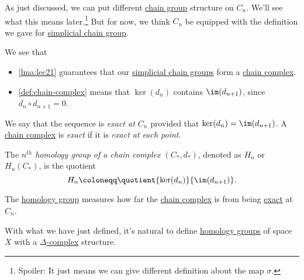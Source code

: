 \begin{note}
	As just discussed, we can put different \hyperref[def:chain-group]{chain group} structure on \(C_{n} \). We'll see what this means later.\footnote{Spoiler: It just means we can give different definition about the map \(\sigma\).} But for now, we think \(C_{n} \) be equipped with the definition we gave for \hyperref[def:simplicial-chain-group]{simplicial chain group}.
\end{note}

\begin{remark}
	We see that
	\begin{itemize}
		\item \autoref{lma:lec21} guarantees that our \hyperref[def:simplicial-chain-group]{simplicial chain groups} form a \hyperref[def:chain-complex]{chain complex}.
		\item \autoref{def:chain-complex} means that \(\ker (d_{n} ) \) contains \(\im  (d_{n+1})\), since \(d_{n} \circ d_{n+1} = 0\).
	\end{itemize}
\end{remark}

\begin{definition}[Exact]\label{def:exact}
	We say that the sequence is \emph{exact at \(C_{n} \)} provided that \(\ker (d_{n}) = \im (d_{n+1})\). A \hyperref[def:chain-complex]{chain complex} is \emph{exact} if it is \emph{exact at each point}.
\end{definition}

\begin{definition}\label{def:homology-group}
	The \emph{\(n^{th} \) homology group of a chain complex \((C_\ast, d_\ast)\)}, denoted as \(H_{n} \) or \(H_{n} (C_\ast)\), is the quotient
	\[
		H_{n} \coloneqq \quotient{\ker  (d_{n} )}{\im  (d_{n+1})}.
	\]
\end{definition}

\begin{remark}
	The \hyperref[def:homology-group]{homology group} measures how far the \hyperref[def:chain-complex]{chain complex} is from being \hyperref[def:exact]{exact} at \(C_{n} \).
\end{remark}

With what we have just defined, it's natural to define \hyperref[def:homology-group]{homology groups} of space \(X\) with a \hyperref[def:delta-complex]{\(\Delta \)-complex} structure.


